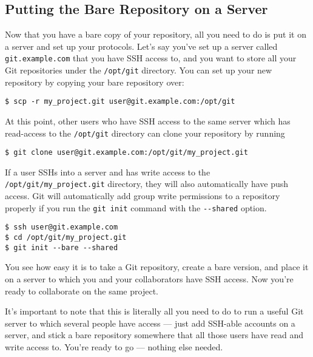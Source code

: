\documentclass[a4paper]{book}
\begin{document}
\subsection{Putting the Bare Repository on a Server}\label{putting-the-bare-repository-on-a-server}

Now that you have a bare copy of your repository, all you need to do is put it on a server and set up your protocols. Let's say you've set up a server called \texttt{git.example.com} that you have SSH access to, and you want to store all your Git repositories under the \texttt{/opt/git} directory. You can set up your new repository by copying your bare repository over:

\begin{shaded}\begin{verbatim}
$ scp -r my_project.git user@git.example.com:/opt/git
\end{verbatim}\end{shaded}

At this point, other users who have SSH access to the same server which has read-access to the \texttt{/opt/git} directory can clone your repository by running

\begin{shaded}\begin{verbatim}
$ git clone user@git.example.com:/opt/git/my_project.git
\end{verbatim}\end{shaded}

If a user SSHs into a server and has write access to the \texttt{/opt/git/my\_project.git} directory, they will also automatically have push access. Git will automatically add group write permissions to a repository properly if you run the \texttt{git init} command with the \texttt{-{}-shared} option.

\begin{shaded}\begin{verbatim}
$ ssh user@git.example.com
$ cd /opt/git/my_project.git
$ git init --bare --shared
\end{verbatim}\end{shaded}

You see how easy it is to take a Git repository, create a bare version, and place it on a server to which you and your collaborators have SSH access. Now you're ready to collaborate on the same project.

It's important to note that this is literally all you need to do to run a useful Git server to which several people have access --- just add SSH-able accounts on a server, and stick a bare repository somewhere that all those users have read and write access to. You're ready to go --- nothing else needed.
\end{document}
